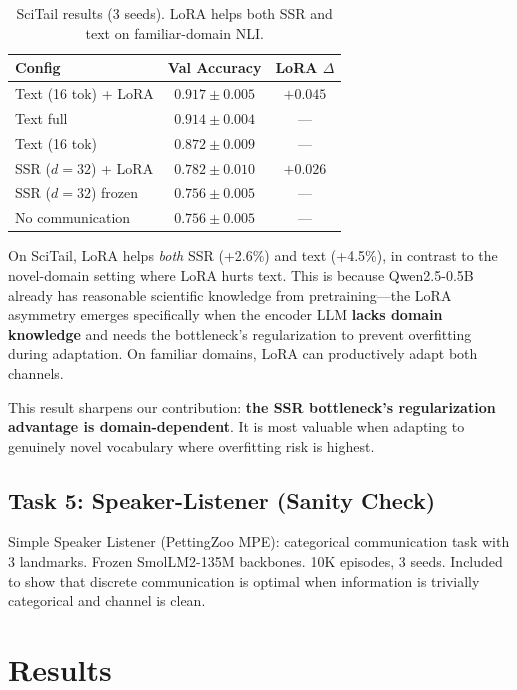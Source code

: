 \documentclass[11pt,a4paper]{article}
\begin{document}
\begin{table}[h]
\centering
\caption{SciTail results (3 seeds). LoRA helps both SSR and text on familiar-domain NLI.}
\vspace{0.3em}
\begin{tabular}{@{}lcc@{}}
\toprule
\textbf{Config} & \textbf{Val Accuracy} & \textbf{LoRA $\Delta$} \\
\midrule
Text (16 tok) + LoRA & $\mathbf{0.917 \pm 0.005}$ & $+0.045$ \\
Text full             & $0.914 \pm 0.004$ & --- \\
Text (16 tok)         & $0.872 \pm 0.009$ & --- \\
SSR ($d{=}32$) + LoRA & $0.782 \pm 0.010$ & $+0.026$ \\
SSR ($d{=}32$) frozen & $0.756 \pm 0.005$ & --- \\
No communication      & $0.756 \pm 0.005$ & --- \\
\bottomrule
\end{tabular}
\end{table}

On SciTail, LoRA helps \emph{both} SSR (+2.6\%) and text (+4.5\%), in contrast to the novel-domain setting where LoRA hurts text. This is because Qwen2.5-0.5B already has reasonable scientific knowledge from pretraining---the LoRA asymmetry emerges specifically when the encoder LLM \textbf{lacks domain knowledge} and needs the bottleneck's regularization to prevent overfitting during adaptation. On familiar domains, LoRA can productively adapt both channels.

This result sharpens our contribution: \textbf{the SSR bottleneck's regularization advantage is domain-dependent}. It is most valuable when adapting to genuinely novel vocabulary where overfitting risk is highest.

\subsection{Task 5: Speaker-Listener (Sanity Check)}

Simple Speaker Listener (PettingZoo MPE): categorical communication task with 3 landmarks. Frozen SmolLM2-135M backbones. 10K episodes, 3 seeds. Included to show that discrete communication is optimal when information is trivially categorical and channel is clean.

\section{Results}
\end{document}
